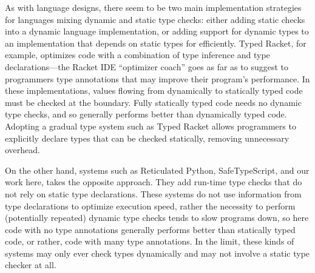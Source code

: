 As with language designs, there seem to be two main implementation
strategies for languages mixing dynamic and static type checks: either
adding static checks into a dynamic language implementation, or adding
support for dynamic types to an implementation that depends on
static types for efficiently. Typed Racket, for example, optimizes code with
a combination of type inference and type declarations---the Racket
IDE ``optimizer coach'' goes as far as to suggest to programmers type
annotations that may improve their program's performance\citep{optimizerCoach2012}. In these implementations, values flowing
from dynamically to statically typed code must be checked at the
boundary.  Fully statically typed code needs no dynamic type checks,
and so generally performs better than dynamically typed code. Adopting
a gradual type system such as Typed Racket\citep{typedScheme08} allows
programmers to explicitly declare types that can be checked statically,
removing unnecessary overhead.

On the other hand, systems such as Reticulated Python\citep{reticPython2014}, SafeTypeScript\citep{Richards2017}, and our
work here, takes the opposite approach.
They add run-time type checks that do not rely on static
type declarations. These systems do not use information from type
declarations to optimize execution speed, rather the necessity to
perform (potentially repeated) dynamic type checks tends to slow
programs down, so here code with no type annotations generally
performs better than statically typed code, or rather, code with many
type annotations. In the limit, these kinds of systems may only ever
check types dynamically and may not involve a static type checker at
all. 


